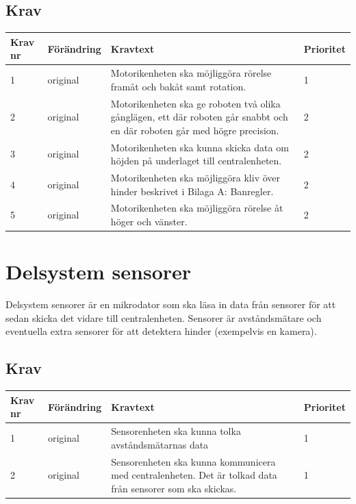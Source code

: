 \documentclass[a4paper,titlepage,12pt]{article}
\begin{document}
	\subsection{Krav}
	\begin{table}[h!]
		\label{tab:label}
		\begin{tabularx}{\textwidth}{|l|l|X|l|}
			\hline
			\textbf{Krav nr} & \textbf{Förändring} & \textbf{Kravtext} & \textbf{Prioritet} 
				\\ \hline

			1 & original & Motorikenheten ska möjliggöra rörelse framåt och bakåt samt rotation. & 1
				\\ \hline

			2 & original & Motorikenheten ska ge roboten två olika gånglägen, ett där roboten går 
				snabbt och en där roboten går med högre precision.& 2
				\\ \hline

			3 & original & Motorikenheten ska kunna skicka data om höjden på underlaget
  				till centralenheten. & 2
				\\ \hline

			4 & original & Motorikenheten ska möjliggöra kliv över hinder beskrivet i Bilaga A:
  				Banregler. & 2
				\\ \hline

			5 & original & Motorikenheten ska möjliggöra rörelse åt höger och vänster. & 2 \\\hline
		\end{tabularx}
	\end{table}


	\section{Delsystem sensorer}
	Delsystem sensorer är en mikrodator som ska läsa in data från sensorer för att sedan skicka 
	det vidare till centralenheten. Sensorer är avståndsmätare och eventuella extra sensorer 
	för att detektera hinder (exempelvis en kamera).

	\subsection{Krav}
	\begin{table}[h!]
		\label{tab:label}
		\begin{tabularx}{\textwidth}{|l|l|X|l|}
			\hline
			\textbf{Krav nr} & \textbf{Förändring} & \textbf{Kravtext} & \textbf{Prioritet} 
				\\ \hline

			1 & original & Sensorenheten ska kunna tolka avståndsmätarnas data & 1
				\\ \hline

			2 & original & Sensorenheten ska kunna kommunicera med centralenheten. Det är 
				tolkad data från sensorer som ska skickas.& 1
				\\ \hline

		\end{tabularx}
	\end{table}
\end{document}
